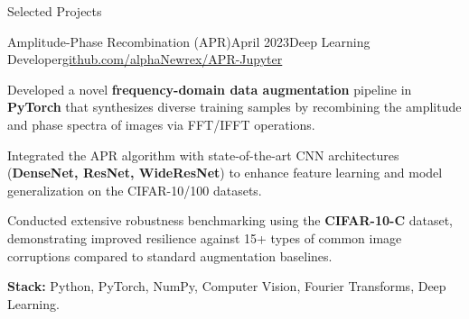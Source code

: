 \begin{rSection}{Selected Projects}
    \begin{rSubsection}{Amplitude-Phase Recombination (APR)}{April 2023}{Deep Learning Developer}{\href{https://github.com/alphaNewrex/APR-Jupyter}{github.com/alphaNewrex/APR-Jupyter}}
        \item Developed a novel \textbf{frequency-domain data augmentation} pipeline in \textbf{PyTorch} that synthesizes diverse training samples by recombining the amplitude and phase spectra of images via FFT/IFFT operations.
        \item Integrated the APR algorithm with state-of-the-art CNN architectures (\textbf{DenseNet, ResNet, WideResNet}) to enhance feature learning and model generalization on the CIFAR-10/100 datasets.
        \item Conducted extensive robustness benchmarking using the \textbf{CIFAR-10-C} dataset, demonstrating improved resilience against 15+ types of common image corruptions compared to standard augmentation baselines.
        \item \textbf{Stack:} Python, PyTorch, NumPy, Computer Vision, Fourier Transforms, Deep Learning.
    \end{rSubsection}

\end{rSection}